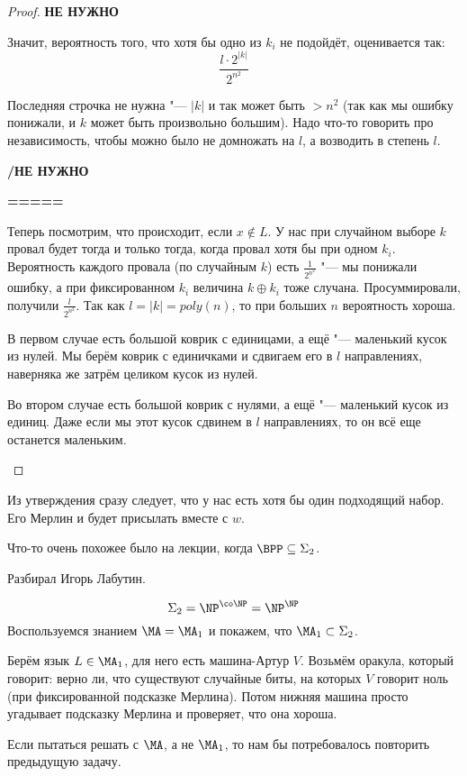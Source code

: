\begin{proof}
		\textbf{НЕ НУЖНО}

		Значит, вероятность того, что хотя бы одно из $k_i$ не подойдёт, оценивается так:
		\[ \frac{l \cdot 2^{|k|}}{2^{n^2}} \]
		\begin{Rem}
			Последняя строчка не нужна "--- $|k|$ и так может быть $>n^2$ (так как мы ошибку понижали,
			и $k$ может быть произвольно большим).
			Надо что-то говорить про независимость, чтобы можно было не домножать на $l$, а возводить в степень $l$.
		\end{Rem}

		\textbf{/НЕ НУЖНО}

		\textbf{=====}

		Теперь посмотрим, что происходит, если $x \notin L$.
		У нас при случайном выборе $k$ провал будет тогда и только тогда, когда
		провал хотя бы при одном $k_i$.
		Вероятность каждого провала (по случайным $k$) есть $\frac{1}{2^{n^2}}$ "--- мы понижали ошибку,
		а при фиксированном $k_i$ величина $k \oplus k_i$ тоже случана.
		Просуммировали, получили $\frac{l}{2^{n^2}}$.
		Так как $l=|k|=poly(n)$, то при больших $n$ вероятность хороша.

		\begin{Rem}
			В первом случае есть большой коврик с единицами, а ещё "--- маленький кусок из нулей.
			Мы берём коврик с единичками и сдвигаем его в $l$ направлениях, наверняка же затрём целиком кусок из нулей.

			Во втором случае есть большой коврик с нулями, а ещё "--- маленький кусок из единиц.
			Даже если мы этот кусок сдвинем в $l$ направлениях, то он всё еще останется маленьким.
		\end{Rem}
	\end{proof}
	Из утверждения сразу следует, что у нас есть хотя бы один подходящий набор.
	Его Мерлин и будет присылать вместе с $w$.

	\begin{Rem}
		Что-то очень похожее было на лекции, когда $\BPP \subseteq \Sigma_2$.
	\end{Rem}

	Разбирал Игорь Лабутин.

	\[ \Sigma_2 = \NP^{\co\NP} = \NP^{\NP} \]
	Воспользуемся знанием $\MA=\MA_1$ и покажем, что $\MA_1 \subset \Sigma_2$.

	Берём язык $L \in \MA_1$, для него есть машина-Артур $V$.
	Возьмём оракула, который говорит: верно ли, что существуют случайные биты, на которых $V$ говорит ноль
	(при фиксированной подсказке Мерлина).
	Потом нижняя машина просто угадывает подсказку Мерлина и проверяет, что она хороша.
	\begin{Rem}
		Если пытаться решать с $\MA$, а не $\MA_1$, то нам бы потребовалось повторить предыдущую задачу.
	\end{Rem}

